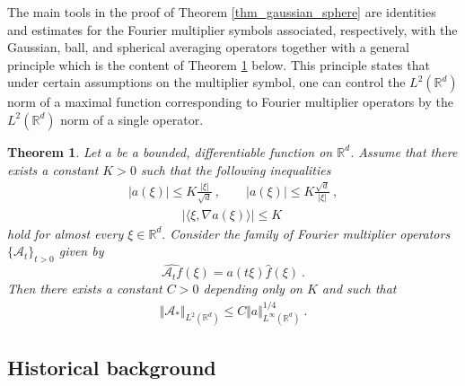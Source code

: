 \documentclass[a4paper, reqno]{amsart}
\newtheorem{thm}{Theorem}[section]
\theoremstyle{definition}
\newcommand{\R}{{\mathbb R}}
\newcommand{\dd}{{\mathrm d}}
\newcommand{\Fm}{\mathcal{A}}
\begin{document}
The main tools in the proof of Theorem \ref{thm_gaussian_sphere} are identities and estimates for the Fourier multiplier symbols associated, respectively, with the Gaussian, ball, and spherical averaging operators together with a general principle which is the content of Theorem \ref{general_thm} below. This principle states that under certain assumptions on the multiplier symbol, one can control the $L^2(\R^d)$ norm of a maximal function corresponding to Fourier multiplier operators by the $L^2(\R^d)$ norm of a single operator. 
\begin{thm}\label{general_thm}
    Let $a$ be a bounded, differentiable function on $\mathbb{R}^d$. Assume that there exists a constant $K>0$
such that the following inequalities
\begin{align}\label{eq_general_thm_pointwise_estimate_multiplier_1}
    |a(\xi)|\leq K \frac{|\xi|}{\sqrt{d}}  ~,
\qquad
    |a(\xi)|\leq K \frac{\sqrt{d}}{|\xi|} ~,
\end{align}
\begin{align}\label{eq_general_thm_pointwise_estimate_multiplier_gradient}
    \vert \langle \xi, \nabla a(\xi)\rangle \vert \leq K~
\end{align}
hold for almost every $\xi \in \R^d.$ Consider the family of Fourier multiplier operators $\lbrace \Fm_t\rbrace_{t>0}$ given by
    $$\widehat{\Fm_t f}(\xi)=a(t\xi)\widehat{f}(\xi)~.$$
   Then there exists a constant $C>0$ depending only on $K$ and such that 
    \begin{align*}
        \Vert  \Fm_*  \Vert_{L^2(\mathbb{R}^d)} \leq C \Vert a \Vert_{L^\infty(\mathbb{R}^d)}^{ 1/4}~. %
    \end{align*}
\end{thm}



\subsection{Historical background}
\end{document}
